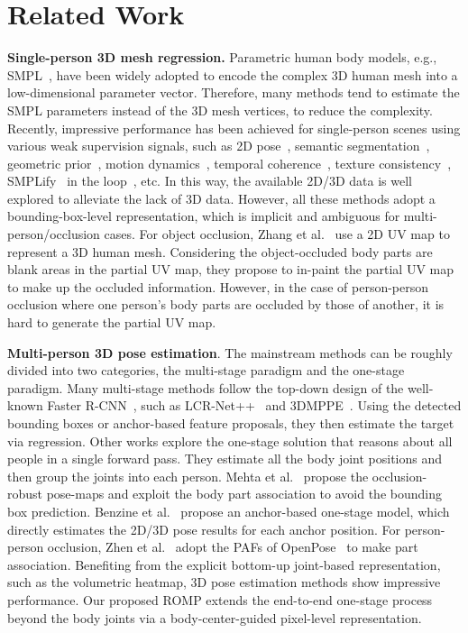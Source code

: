 \documentclass[10pt,twocolumn,letterpaper]{article}
\begin{document}
\vspace{-2mm}
\section{Related Work}
\vspace{-1mm}
\textbf{Single-person 3D mesh regression.} 
Parametric human body models, e.g., SMPL~\cite{SMPL}, have been widely adopted to encode the complex 3D human mesh into a low-dimensional parameter vector.
Therefore, many methods tend to estimate the SMPL parameters instead of the 3D mesh vertices, to reduce the complexity.
Recently, impressive performance has been achieved for single-person scenes using various weak supervision signals, such as 2D pose~\cite{hmr,sun2019dsd-satn}, semantic segmentation~\cite{Xu_2019_ICCV}, geometric prior~\cite{hmr}, motion dynamics~\cite{kanazawa2019learning}, temporal coherence~\cite{kocabas2020vibe,sun2019dsd-satn}, texture consistency~\cite{pavlakos2019texturepose}, SMPLify~\cite{keep} in the loop~\cite{kolotouros2019spin}, etc.
In this way, the available 2D/3D data is well explored to alleviate the lack of 3D data.
However, all these methods adopt a bounding-box-level representation, which is implicit and ambiguous for multi-person/occlusion cases.
For object occlusion, Zhang et al.~\cite{zhang2020object} use a 2D UV map to represent a 3D human mesh. 
Considering the object-occluded body parts are blank areas in the partial UV map, they propose to in-paint the partial UV map to make up the occluded information.
However, in the case of person-person occlusion where one person's body parts are occluded by those of another, it is hard to generate the partial UV map.

\textbf{Multi-person 3D pose estimation}. 
The mainstream methods can be roughly divided into two categories, the multi-stage paradigm and the one-stage paradigm.
Many multi-stage methods follow the top-down design of the well-known Faster R-CNN~\cite{ren2015fasterrcnn}, such as LCR-Net++~\cite{rogez2019lcr} and 3DMPPE~\cite{moon2019camera}. 
Using the detected bounding boxes or anchor-based feature proposals, they then estimate the target via regression.
Other works explore the one-stage solution that reasons about all people in a single forward pass. They estimate all the body joint positions and then group the joints into each person.
Mehta et al.~\cite{mehta2018single} propose the occlusion-robust pose-maps and exploit the body part association to avoid the bounding box prediction.
Benzine et al.~\cite{PandaNet_Benzine_2020_CVPR} propose an anchor-based one-stage model, which directly estimates the 2D/3D pose results for each anchor position. 
For person-person occlusion, Zhen et al.~\cite{zhen2020smap} adopt the PAFs of OpenPose~\cite{openpose} to make part association.
Benefiting from the explicit bottom-up joint-based representation, such as the volumetric heatmap, 3D pose estimation methods show impressive performance.
Our proposed ROMP extends the end-to-end one-stage process beyond the body joints via a body-center-guided pixel-level representation.
\end{document}
